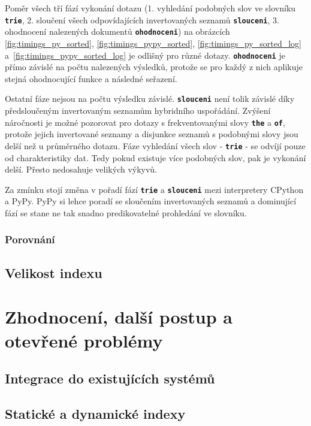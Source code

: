 \documentclass[11pt,letterpaper,oneside,openright]{book}
\newcommand{\bftt}[1]{\texttt{\textbf{#1}}}
\begin{document}
Poměr všech tří fází vykonání dotazu (1. vyhledání podobných slov ve slovníku
\bftt{trie}, 2. sloučení všech odpovídajících invertovaných seznamů
\bftt{slouceni}, 3. ohodnocení nalezených dokumentů \bftt{ohodnoceni}) na
obrázcích \ref{fig:timings_py_sorted}, \ref{fig:timings_pypy_sorted},
\ref{fig:timings_py_sorted_log} a~\ref{fig:timings_pypy_sorted_log} je odlišný
pro různé dotazy. \bftt{ohodnoceni} je přímo závislé na počtu nalezených
výsledků, protože se pro každý z nich aplikuje stejná ohodnocující funkce a
následné seřazení. 

Ostatní fáze nejsou na počtu výsledku závislé. \bftt{slouceni} není tolik
závislé díky předsloučeným invertovaným seznamům hybridního uspořádání. Zvýšení
náročnosti je možné pozorovat pro dotazy s frekventovanými slovy \bftt{the} a
\bftt{of}, protože jejich invertované seznamy a disjunkce seznamů s podobnými
slovy jsou delší než u průměrného dotazu. Fáze vyhledání všech slov -
\bftt{trie} - se odvíjí pouze od charakteristiky dat. Tedy pokud existuje více
podobných slov, pak je vykonání delší. Přesto nedosahuje velikých výkyvů.

Za zmínku stojí změna v pořadí fází \bftt{trie} a \bftt{slouceni} mezi
interpretery CPython a PyPy. PyPy si lehce poradí se sloučením invertovaných
seznamů a dominující fází se stane ne tak snadno predikovatelné prohledání ve
slovníku.


\subsection{Porovnání}

\section{Velikost indexu}

\chapter{Zhodnocení, další postup a otevřené problémy}
\section{Integrace do existujících systémů}
\section{Statické a dynamické indexy}
\end{document}
